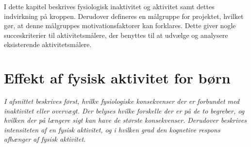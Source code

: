 I dette kapitel beskrives fysiologisk inaktivitet og aktivitet samt dettes indvirkning på kroppen. Derudover defineres en målgruppe for projektet, hvilket gør, at denne målgruppes motivationsfaktorer kan forklares. Dette giver nogle succeskriterier til aktivitetsmålere, der benyttes til at udvælge og analysere eksisterende aktivitetsmålere.

\section{Effekt af fysisk aktivitet for børn}\label{sec:fysio}
\textit{I afsnittet beskrives først, hvilke fysiologiske konsekvenser der er forbundet med inaktivitet eller overvægt. Der belyses hvilke forskelle der er på de to begreber, og hvilken der på længere sigt kan have de største konsekvenser. Derudover beskrives intensiteten af en fysisk aktivitet, og i hvilken grad den kognetive respons afhænger af fysisk aktivitet. }

